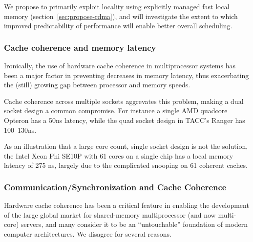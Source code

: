 We propose to primarily exploit locality using explicitly managed fast local 
memory (section~\ref{sec:propose-rdma}), and will investigate the extent to 
which improved predictability of performance will enable better overall scheduling.

\subsubsection{Cache coherence and memory latency}

Ironically, the use of hardware cache coherence in multiprocessor systems has 
been a major factor in preventing decreases in memory latency, thus exacerbating
the (still) growing gap between processor and memory speeds.

Cache coherence across multiple sockets aggrevates this problem, making
a dual socket design a common compromise.
For instance a single AMD quadcore Opteron has a 50ns latency, while the quad socket
design in TACC's Ranger has 100--130ns.

As an illustration that a large core count, single socket design
is not the solution, the 
Intel Xeon Phi SE10P with 61 cores on a single chip
has a local memory latency of 275 ns, largely due
to the complicated snooping on 61 coherent caches.

\subsubsection{Communication/Synchronization and Cache Coherence}
\label{sec:issue-coherence}

Hardware  cache coherence has been a critical feature in enabling
the development of the large global market for shared-memory multiprocessor (and now
multi-core) servers, and many consider it to be an ``untouchable'' foundation of 
modern computer architectures.  We disagree for several reasons.



